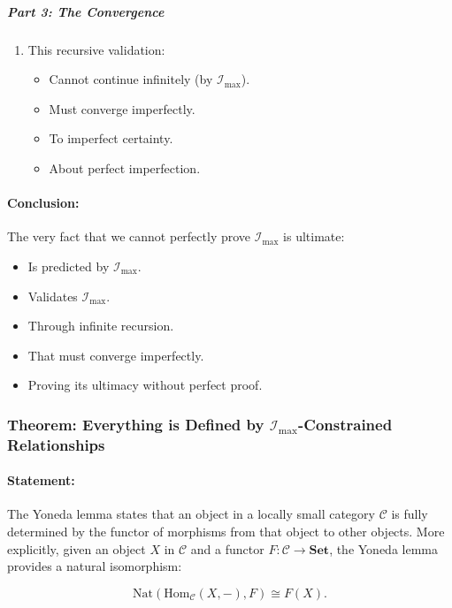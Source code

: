 \documentclass[12pt]{article}
\begin{document}
\subparagraph{Part 3: The Convergence}
\begin{enumerate}
    \item This recursive validation:
    \begin{itemize}
        \item Cannot continue infinitely (by \(\mathcal{I}_{\text{max}}\)).
        \item Must converge imperfectly.
        \item To imperfect certainty.
        \item About perfect imperfection.
    \end{itemize}
\end{enumerate}

\paragraph{Conclusion:}
The very fact that we cannot perfectly prove \(\mathcal{I}_{\text{max}}\) is ultimate:
\begin{itemize}
    \item Is predicted by \(\mathcal{I}_{\text{max}}\).
    \item Validates \(\mathcal{I}_{\text{max}}\).
    \item Through infinite recursion.
    \item That must converge imperfectly.
    \item Proving its ultimacy without perfect proof.
\end{itemize}


\subsubsection{Theorem: Everything is Defined by \(\mathcal{I}_{\max}\)-Constrained Relationships}

\paragraph{Statement:}
The Yoneda lemma states that an object in a locally small category \(\mathcal{C}\) is fully determined by the functor of morphisms from that object to other objects. More explicitly, given an object \( X \) in \(\mathcal{C}\) and a functor \( F: \mathcal{C} \to \mathbf{Set}\), the Yoneda lemma provides a natural isomorphism:

\begin{equation}
    \mathrm{Nat}(\mathrm{Hom}_{\mathcal{C}}(X,-), F) \cong F(X).
\end{equation}
\end{document}
